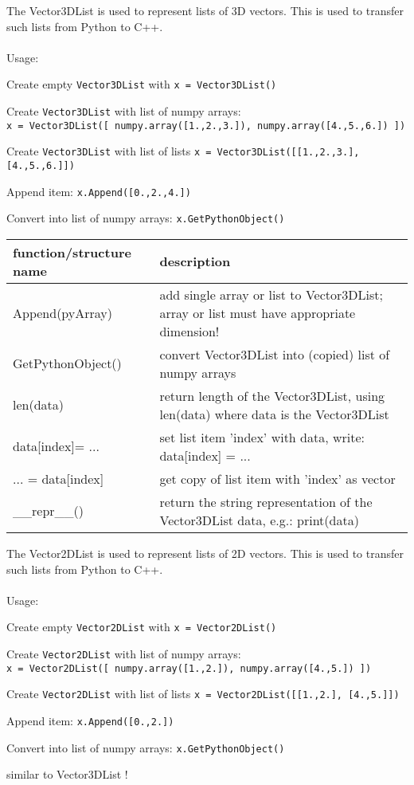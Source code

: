 The Vector3DList is used to represent lists of 3D vectors. This is used to transfer such lists from Python to C++. \\ \\ Usage: \bi
  \item Create empty \texttt{Vector3DList} with \texttt{x = Vector3DList()} 
  \item Create \texttt{Vector3DList} with list of numpy arrays:\\\texttt{x = Vector3DList([ numpy.array([1.,2.,3.]), numpy.array([4.,5.,6.]) ])}
  \item Create \texttt{Vector3DList} with list of lists \texttt{x = Vector3DList([[1.,2.,3.], [4.,5.,6.]])}
  \item Append item: \texttt{x.Append([0.,2.,4.])}
  \item Convert into list of numpy arrays: \texttt{x.GetPythonObject()}
\ei


\begin{center}
\footnotesize
\begin{longtable}{| p{8cm} | p{8cm} |} 
\hline
{\bf function/structure name} & {\bf description}\\ \hline
  Append(pyArray) & add single array or list to Vector3DList; array or list must have appropriate dimension!\\ \hline 
  GetPythonObject() & convert Vector3DList into (copied) list of numpy arrays\\ \hline 
  len(data) & return length of the Vector3DList, using len(data) where data is the Vector3DList\\ \hline 
  data[index]= ... & set list item 'index' with data, write: data[index] = ...\\ \hline 
  ... = data[index] & get copy of list item with 'index' as vector\\ \hline 
  \_\_repr\_\_() & return the string representation of the Vector3DList data, e.g.: print(data)\\ \hline 
\end{longtable}
\end{center}

The Vector2DList is used to represent lists of 2D vectors. This is used to transfer such lists from Python to C++. \\ \\ Usage: \bi
  \item Create empty \texttt{Vector2DList} with \texttt{x = Vector2DList()} 
  \item Create \texttt{Vector2DList} with list of numpy arrays:\\\texttt{x = Vector2DList([ numpy.array([1.,2.]), numpy.array([4.,5.]) ])}
  \item Create \texttt{Vector2DList} with list of lists \texttt{x = Vector2DList([[1.,2.], [4.,5.]])}
  \item Append item: \texttt{x.Append([0.,2.])}
  \item Convert into list of numpy arrays: \texttt{x.GetPythonObject()}
  \item similar to Vector3DList !
\ei


